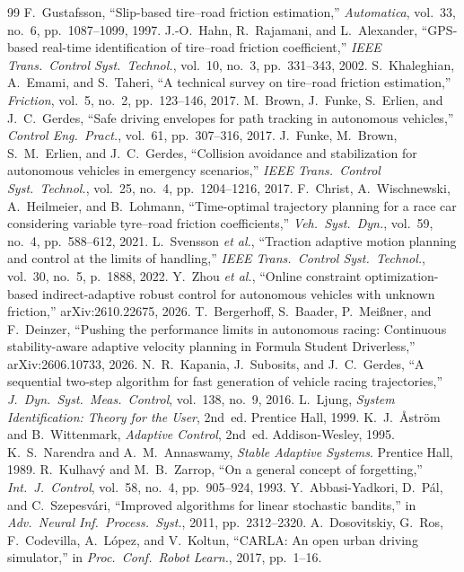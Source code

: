 \documentclass[letterpaper,journal,twoside]{IEEEtran}%
\begin{document}
\begin{thebibliography}{99}
\footnotesize
{} F.~Gustafsson, ``Slip-based tire--road friction estimation,'' \emph{Automatica}, vol.~33, no.~6, pp.~1087--1099, 1997.
 J.-O.~Hahn, R.~Rajamani, and L.~Alexander, ``GPS-based real-time identification of tire--road friction coefficient,'' \emph{IEEE Trans.\ Control Syst.\ Technol.}, vol.~10, no.~3, pp.~331--343, 2002.
 S.~Khaleghian, A.~Emami, and S.~Taheri, ``A technical survey on tire--road friction estimation,'' \emph{Friction}, vol.~5, no.~2, pp.~123--146, 2017.
 M.~Brown, J.~Funke, S.~Erlien, and J.~C.~Gerdes, ``Safe driving envelopes for path tracking in autonomous vehicles,'' \emph{Control Eng.\ Pract.}, vol.~61, pp.~307--316, 2017.
 J.~Funke, M.~Brown, S.~M.~Erlien, and J.~C.~Gerdes, ``Collision avoidance and stabilization for autonomous vehicles in emergency scenarios,'' \emph{IEEE Trans.\ Control Syst.\ Technol.}, vol.~25, no.~4, pp.~1204--1216, 2017.
 F.~Christ, A.~Wischnewski, A.~Heilmeier, and B.~Lohmann, ``Time-optimal trajectory planning for a race car considering variable tyre--road friction coefficients,'' \emph{Veh.\ Syst.\ Dyn.}, vol.~59, no.~4, pp.~588--612, 2021.
 L.~Svensson \emph{et al.}, ``Traction adaptive motion planning and control at the limits of handling,'' \emph{IEEE Trans.\ Control Syst.\ Technol.}, vol.~30, no.~5, p.~1888, 2022.
 Y.~Zhou \emph{et al.}, ``Online constraint optimization-based indirect-adaptive robust control for autonomous vehicles with unknown friction,'' arXiv:2610.22675, 2026.
 T.~Bergerhoff, S.~Baader, P.~Mei\ss ner, and F.~Deinzer, ``Pushing the performance limits in autonomous racing: Continuous stability-aware adaptive velocity planning in Formula Student Driverless,'' arXiv:2606.10733, 2026.
 N.~R.~Kapania, J.~Subosits, and J.~C.~Gerdes, ``A sequential two-step algorithm for fast generation of vehicle racing trajectories,'' \emph{J.\ Dyn.\ Syst.\ Meas.\ Control}, vol.~138, no.~9, 2016.
 L.~Ljung, \emph{System Identification: Theory for the User}, 2nd~ed. Prentice Hall, 1999.
 K.~J.~{\AA}str\"om and B.~Wittenmark, \emph{Adaptive Control}, 2nd~ed. Addison-Wesley, 1995.
 K.~S.~Narendra and A.~M.~Annaswamy, \emph{Stable Adaptive Systems}. Prentice Hall, 1989.
 R.~Kulhav\'y and M.~B.~Zarrop, ``On a general concept of forgetting,'' \emph{Int.\ J.\ Control}, vol.~58, no.~4, pp.~905--924, 1993.
 Y.~Abbasi-Yadkori, D.~P\'al, and C.~Szepesv\'ari, ``Improved algorithms for linear stochastic bandits,'' in \emph{Adv.\ Neural Inf.\ Process.\ Syst.}, 2011, pp.~2312--2320.
 A.~Dosovitskiy, G.~Ros, F.~Codevilla, A.~L\'opez, and V.~Koltun, ``CARLA: An open urban driving simulator,'' in \emph{Proc.\ Conf.\ Robot Learn.}, 2017, pp.~1--16.
\end{thebibliography}
\end{document}

